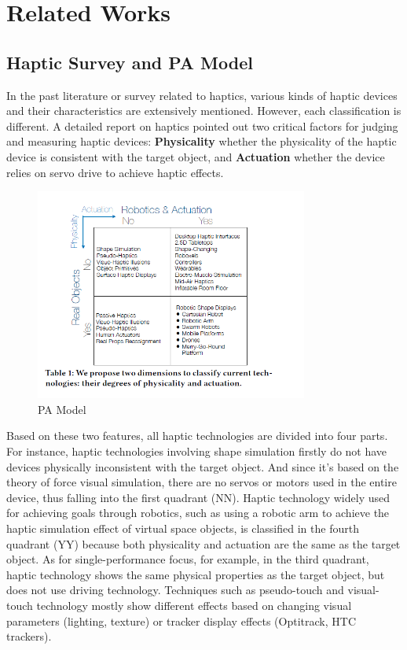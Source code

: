 \chapter{Related Works}

\section{Haptic Survey and PA Model}
In the past literature or survey related to haptics, various kinds of haptic devices and their characteristics are extensively mentioned. However, each classification is different. A detailed report on haptics\cite{ref_S001} pointed out two critical factors for judging and measuring haptic devices: \textbf{Physicality} whether the physicality of the haptic device is consistent with the target object, and \textbf{Actuation} whether the device relies on servo drive to achieve haptic effects. 

\begin{figure}[h]
\centering
\includegraphics[width=0.8\textwidth]{A_thesis/figures/001.png}
\caption{PA Model}
\end{figure}


Based on these two features, all haptic technologies are divided into four parts. For instance, haptic technologies involving shape simulation firstly do not have devices physically inconsistent with the target object. And since it's based on the theory of force visual simulation, there are no servos or motors used in the entire device, thus falling into the first quadrant (NN). Haptic technology widely used for achieving goals through robotics, such as using a robotic arm to achieve the haptic simulation effect of virtual space objects, is classified in the fourth quadrant (YY) because both physicality and actuation are the same as the target object. As for single-performance focus, for example, in the third quadrant, haptic technology shows the same physical properties as the target object, but does not use driving technology. Techniques such as pseudo-touch and visual-touch technology mostly show different effects based on changing visual parameters (lighting, texture) or tracker display effects (Optitrack, HTC trackers).

